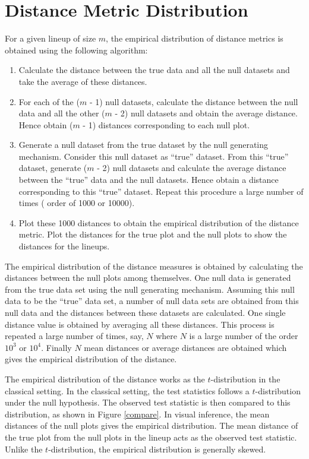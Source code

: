 \documentclass[12]{article}
\begin{document}
\section{Distance Metric Distribution} \label{sec:distri}

For a given lineup of size $m$, the empirical distribution of distance metrics is obtained using the following algorithm:

\begin{enumerate} \itemsep 0in
\item Calculate the distance between the true data and all the null datasets and take the average of these distances. 

\item For each of the ($m$ - 1) null datasets, calculate the distance between the null data and all the other ($m$ - 2) null datasets and obtain the average distance. Hence obtain ($m$ - 1) distances corresponding to each null plot.

\item Generate a null dataset from the true dataset by the null generating mechanism. Consider this null dataset as ``true'' dataset. From this ``true'' dataset, generate ($m$ - 2) null datasets and calculate the average distance between the ``true'' data and the null datasets. Hence obtain a distance corresponding to this ``true'' dataset. Repeat this procedure a large number of times ( order of 1000 or 10000).

\item Plot these 1000 distances to obtain the empirical distribution of the distance metric. Plot the distances for the true plot and the null plots to show the distances for the lineups. 
\end{enumerate}

The empirical distribution of the distance measures is obtained by calculating the distances between the null plots among themselves. One null data is generated from the true data set using the null generating mechanism. Assuming this null data to be the ``true'' data set, a number of null data sets are obtained from this null data and the distances between these datasets are calculated. One single distance value is obtained by averaging all these distances. This process is repeated a large number of times, say, $N$ where $N$ is a large number of the order $10^3$ or $10^4$. Finally $N$ mean distances or average distances are obtained which gives the empirical distribution of the distance. 

The empirical distribution of the distance works as the $t$-distribution in the classical setting. In the classical setting, the test statistics follows a $t$-distribution under the null hypothesis. The observed test statistic is then compared to this distribution, as shown in Figure \ref{compare}. In visual inference, the mean distances of the null plots gives the empirical distribution. The mean distance of the true plot from the null plots in the lineup acts as the observed test statistic. Unlike the $t$-distribution, the empirical distribution is generally skewed.
\end{document}
